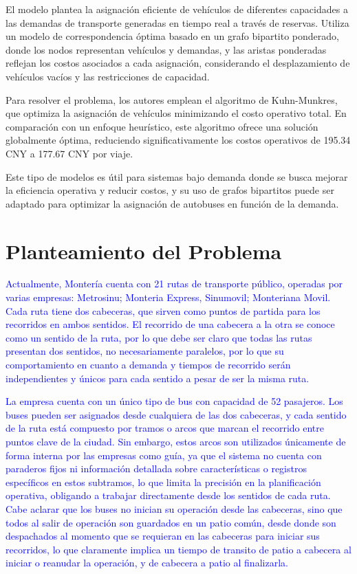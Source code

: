 \documentclass[preprint,11pt]{elsarticle}
\newcommand{\Blue}[1]{\textcolor{blue}{#1}}
\begin{document}
El modelo plantea la asignación eficiente de vehículos de diferentes capacidades a las demandas de transporte generadas en tiempo real a través de reservas. Utiliza un modelo de correspondencia óptima basado en un grafo bipartito ponderado, donde los nodos representan vehículos y demandas, y las aristas ponderadas reflejan los costos asociados a cada asignación, considerando el desplazamiento de vehículos vacíos y las restricciones de capacidad.

Para resolver el problema, los autores emplean el algoritmo de Kuhn-Munkres, que optimiza la asignación de vehículos minimizando el costo operativo total. En comparación con un enfoque heurístico, este algoritmo ofrece una solución globalmente óptima, reduciendo significativamente los costos operativos de 195.34 CNY a 177.67 CNY por viaje. 

Este tipo de modelos es útil para sistemas bajo demanda donde se busca mejorar la eficiencia operativa y reducir costos, y su uso de grafos bipartitos puede ser adaptado para optimizar la asignación de autobuses en función de la demanda.

\section{Planteamiento del Problema}

\Blue{Actualmente, Montería cuenta con 21 rutas de transporte público, operadas por varias empresas: Metrosinu; Monteria Express, Sinumovil; Monteriana Movil. Cada ruta tiene dos cabeceras, que sirven como puntos de partida para los recorridos en ambos sentidos. El recorrido de una cabecera a la otra se conoce como un sentido de la ruta, por lo que debe ser claro que todas las rutas presentan dos sentidos, no necesariamente paralelos, por lo que su comportamiento en cuanto a demanda y tiempos de recorrido serán independientes y únicos para cada sentido a pesar de ser la misma ruta. }

\Blue{La empresa cuenta con un único tipo de bus con capacidad de 52 pasajeros. Los buses pueden ser asignados desde cualquiera de las dos cabeceras, y cada sentido de la ruta está compuesto por tramos o arcos que marcan el recorrido entre puntos clave de la ciudad. Sin embargo, estos arcos son utilizados únicamente de forma interna por las empresas como guía, ya que el sistema no cuenta con paraderos fijos ni información detallada sobre características o registros específicos en estos subtramos, lo que limita la precisión en la planificación operativa, obligando a trabajar directamente desde los sentidos de cada ruta. Cabe aclarar que los buses no inician su operación desde las cabeceras, sino que todos al salir de operación son guardados en un patio común, desde donde son despachados al momento que se requieran en las cabeceras para iniciar sus recorridos, lo que claramente implica un tiempo de transito de patio a cabecera al iniciar o reanudar la operación, y de cabecera a patio al finalizarla.}
\end{document}
